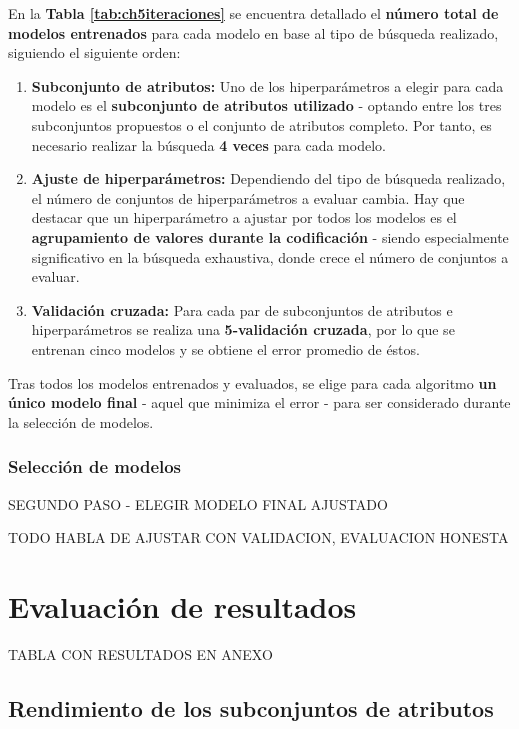 En la \textbf{Tabla \ref{tab:ch5iteraciones}} se encuentra detallado el \textbf{número total de modelos entrenados} para cada modelo en base al tipo de búsqueda realizado, siguiendo el siguiente orden:
\begin{enumerate}
	\item \textbf{Subconjunto de atributos:} Uno de los hiperparámetros a elegir para cada modelo es el \textbf{subconjunto de atributos utilizado} - optando entre los tres subconjuntos propuestos o el conjunto de atributos completo. Por tanto, es necesario realizar la búsqueda \textbf{4 veces} para cada modelo.
	\item \textbf{Ajuste de hiperparámetros:} Dependiendo del tipo de búsqueda realizado, el número de conjuntos de hiperparámetros a evaluar cambia. Hay que destacar que un hiperparámetro a ajustar por todos los modelos es el \textbf{agrupamiento de valores durante la codificación} - siendo especialmente significativo en la búsqueda exhaustiva, donde crece el número de conjuntos a evaluar.
	\item \textbf{Validación cruzada:} Para cada par de subconjuntos de atributos e hiperparámetros se realiza una \textbf{5-validación cruzada}, por lo que se entrenan cinco modelos y se obtiene el error promedio de éstos.
\end{enumerate}

Tras todos los modelos entrenados y evaluados, se elige para cada algoritmo \textbf{un único modelo final} - aquel que minimiza el error - para ser considerado durante la selección de modelos.

\subsubsection{Selección de modelos}

SEGUNDO PASO - ELEGIR MODELO FINAL AJUSTADO

TODO HABLA DE AJUSTAR CON VALIDACION, EVALUACION HONESTA

\section{Evaluación de resultados}

TABLA CON RESULTADOS EN ANEXO

\subsection{Rendimiento de los subconjuntos de atributos}

